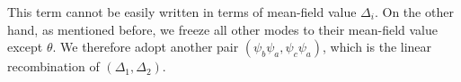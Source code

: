 This term cannot be easily written in terms of mean-field value $\Delta_i$.   On the other hand, as mentioned before, we freeze all  other modes to their mean-field value except $\theta$.  We therefore adopt another pair $({\psi_{b}\psi_{a}},{\psi_{c}\psi_{a}})$, which is the linear recombination of $(\Delta_{1},\Delta_{2})$.  

